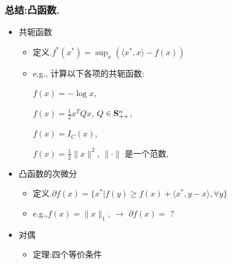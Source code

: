 \documentclass[handout,10pt]{beamer}
\begin{document}
\begin{frame}
\frametitle{总结:凸函数.}
\begin{itemize}
\item 共轭函数

\begin{itemize}
	\item 定义.\mystar $f^*(x^*) = \sup_{x} (\langle x^*,x\rangle - f(x))$
	
	\item   e.g., 计算以下各项的共轭函数:\doublestar
	
	$f(x) =-\log x$,
	
	$f(x) = \frac{1}{2}x^{T}Qx$, $Q\in \mathbf{S}^n_{++}$,
	
	$f(x) = I_C(x)$,
	
	$f(x) = \frac{1}{2}\|x\|^2$, $\|\cdot\|$ 是一个范数,
	
\end{itemize}
\end{itemize}

\begin{itemize}
\item 凸函数的次微分

\begin{itemize}
	\item 定义.\mystar $\partial f(x) =  \{ x^* | f(y) \geq f(x) + \langle x^*,y-x\rangle , \forall y \}$
	
	\item   e.g.,\doublestar $f(x) =\|x\|_1$,
	$\rightarrow$ $\partial f(x)=$ ?
	
\end{itemize}
\end{itemize}

\begin{itemize}
\item 对偶
\begin{itemize}
	\item 定理:四个等价条件
\end{itemize}
\end{itemize}

\end{frame}
\end{document}
